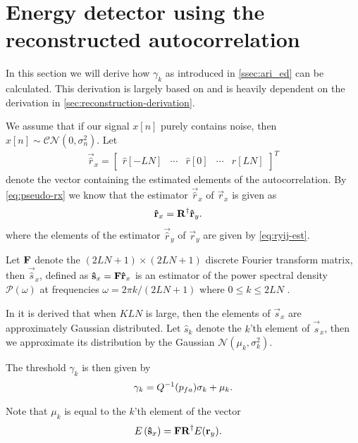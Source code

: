 \documentclass[a4paper, openany, oneside]{memoir}
\begin{document}
\section{Energy detector using the reconstructed autocorrelation}\label{sec:ari_ed_deriv}
In this section we will derive how $\gamma_k$ as introduced in \cref{ssec:ari_ed} can be calculated. This derivation is largely based on \cite{ariananda2012compressive} and is heavily dependent on the derivation in \cref{sec:reconstruction-derivation}.

We assume that if our signal $x[n]$ purely contains noise, then $x[n] \sim \mathcal{CN}(0,\sigma_n^2)$. 
Let
\begin{align*}
    \vec{\hat{r}}_x = \begin{bmatrix}\hat{r}[-LN]& \cdots& \hat{r}[0]& \cdots & \hat{r}[LN]\end{bmatrix}^T
\end{align*}
denote the vector containing the estimated elements of the autocorrelation. 
By \cref{eq:pseudo-rx} we know that the estimator $\vec{\hat{r}}_x$ of $\vec{r}_x$ is given as
\begin{align*}
\vec{\hat{r}}_x &= \mat{R}^{\dagger}\vec{\hat{r}}_y.
\end{align*} where the elements of the estimator $\vec{\hat{r}}_y$ of $\vec{r}_y$ are given by \cref{eq:ryij-est}.

Let $\mat{F}$ denote the $(2LN+1) \times (2LN+1)$ discrete Fourier transform matrix, then $\vec{\hat{s}}_x$, defined as
$\vec{\hat{s}}_x = \mat{F} \vec{\hat{r}}_x$
is an estimator of the power spectral density $\mathcal{P}(\omega)$ at frequencies $\omega = 2\pi k/(2LN+1)$ where $0 \leq k \leq 2LN$ .

In \cite{ariananda2012compressive} it is derived that when $KLN$ is large, then the elements of $\vec{s}_x$ are approximately Gaussian distributed. Let $\hat{s}_k$ denote the $k$'th element of $\vec{\hat{s}}_x$, then we approximate its distribution by the Gaussian $\mathcal{N}(\mu_k, \sigma^2_k)$.

The threshold $\gamma_k$ is then given by 
\begin{align}\label{eq:ari_threshold}
\gamma_k = Q^{-1}(p\ss{fa})\sigma_{k} + \mu_{k}.
\end{align}

Note that $\mu_k$ is equal to the $k$'th element of the vector
\begin{align*}
E\left(\vec{\hat{s}}_x\right) &= \mat{F}\mat{R}^{\dagger}E(\vec{r}_y).
\end{align*}
\end{document}
